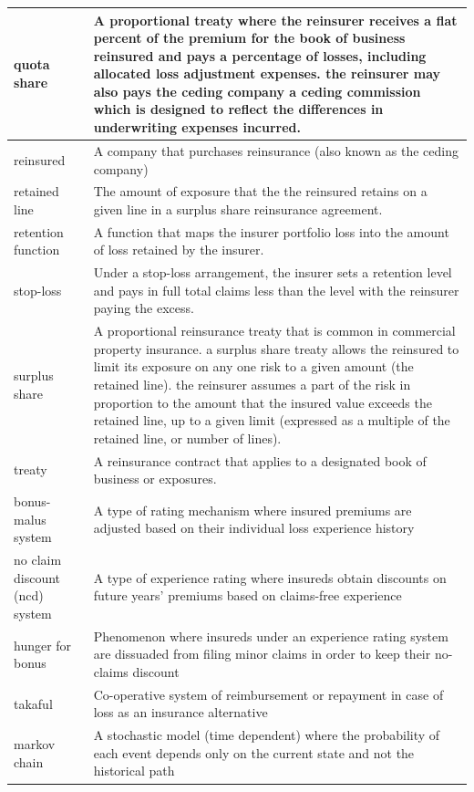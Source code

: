 \documentclass[
]{book}
\begin{document}
\begin{longtable}{>{\raggedright\arraybackslash}p{10em}|>{\raggedright\arraybackslash}p{30em}}
\hline
quota share & A proportional treaty where the reinsurer receives a flat percent of the premium for the book of business reinsured and pays a percentage of losses, including allocated loss adjustment expenses. the reinsurer may also pays the ceding company a ceding commission which is designed to reflect the differences in underwriting expenses incurred.\\
\hline
reinsured & A company that purchases reinsurance (also known as the ceding company)\\
\hline
retained line & The amount of exposure that the the reinsured retains on a given line in a surplus share reinsurance agreement.\\
\hline
retention function & A function that maps the insurer portfolio loss into the amount of loss retained by the insurer.\\
\hline
stop-loss & Under a stop-loss arrangement, the insurer sets a retention level and pays in full total claims less than the level with the reinsurer paying the excess.\\
\hline
surplus share & A proportional reinsurance treaty that is common in commercial property insurance. a surplus share treaty allows the reinsured to limit its exposure on any one risk to a given amount (the retained line). the reinsurer assumes a part of the risk in proportion to the amount that the insured value exceeds the retained line, up to a given limit (expressed as a multiple of the retained line, or number of lines).\\
\hline
treaty & A reinsurance contract that applies to a designated book of business or exposures.\\
\hline
bonus-malus system & A type of rating mechanism where insured premiums are adjusted based on their individual loss experience history\\
\hline
no claim discount (ncd) system & A type of experience rating where insureds obtain discounts on future years' premiums based on claims-free experience\\
\hline
hunger for bonus & Phenomenon where insureds under an experience rating system are dissuaded from filing minor claims in order to keep their no-claims discount\\
\hline
takaful & Co-operative system of reimbursement or repayment in case of loss as an insurance alternative\\
\hline
markov chain & A stochastic model (time dependent) where the probability of each event depends only on the current state and not the historical path\\

\end{longtable}
\end{document}
